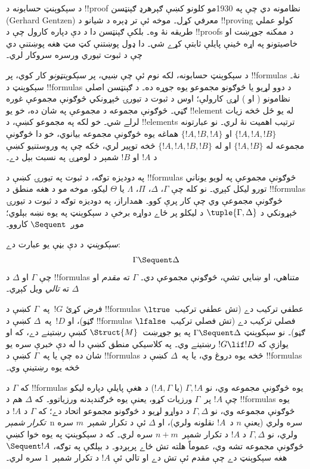 \documentclass[../../../include/open-logic-section]{subfiles}
\begin{document}


د سېکوېنټ حسابونه د !!{proof} نظامونه دي چې په 1930مو کلونو
کښې ګېرهرډ ګېنټسن (Gerhard Gentzen) معرفي کړل۔ موخه ئې تر
ډېره د شيانو د !!{proving} کولو عملي طريقه نۀ وه۔ بلکې ګېنټسن
دا د دې دپاره کارول چې د !!{proof}s د ممکنه جوړښت او خاصيتونو
په اړه ځينې پايلې ثابتې کړے شي۔ دا ډول پوښتنې کټ مټ هغه
پوښتنې دي چې د ثبوت تيوري ورسره سروکار لري۔

د سېکوېنټ حسابونه، لکه نوم ئې چې ښيي، پر \emph{سېکوېنټونو}
کار کوي، پر !!{formula}s نۀ۔ سېکوېنټ د !!{formula}s د دوو
لړيو يا څوګونو مجموعو يوه جوړه ده۔ د ګېنټسن اصلي نظامونو
( او ) لړۍ کارولې؛ اوس د ثبوت د تيورۍ
څېړونکي څوګونې مجموعې غوره ګڼي۔ څوګونې مجموعه د مجموعې
په شان ده، خو يو !!{element} له يو ځل څخه زيات لرلے شي۔
خو لکه په مجموعو کښې، د !!{element}s ترتيب اهميت نۀ لري۔
نو عبارتونه $\{!A, !A, !B\}$ او $\{!A, !B, !A\}$ هماغه يوه
څوګونې مجموعه بيانوي، خو دا څوګونې مجموعه له $\{!A,
!B\}$ او له $\{!A, !A, !B, !B\}$ څخه توپير لري، ځکه چې
په وروستنيو کښې د $!A$ او $!B$ شمېر د لومړۍ په نسبت بېل دے۔

په دوديزه توګه، د ثبوت په تيورۍ کښې د !!{formula}s څوګونې
مجموعې په لويو يوناني تورو ليکل کېږي۔ نو کله چې $\Gamma$، $\Delta$،
$\Pi$، $\Lambda$ يا $\Theta$ ليکو، موخه مو د هغه منطق د
!!{formula}s څوګونې مجموعې وي چې کار پرې کوو۔ همداراز، په
دوديزه توګه د ثبوت د تيورۍ څېړونکي د $\tuple{\Gamma, \Delta}$
د ليکلو پر ځاے دواړه برخې د سېکوېنټ په يوه نښه بېلوي؛
موږ~$\Sequent$ کاروو۔

\begin{defn}[سېکوېنټ]
\emph{سېکوېنټ} د دې بڼې يو عبارت دے:
\[
\Gamma \Sequent \Delta
\]
چې $\Gamma$ او $\Delta$ د !!{formula}s متناهي، او ښايي
تشې، څوګونې مجموعې دي۔ $\Gamma$ ته \emph{مقدم} او
$\Delta$ ته \emph{تالي} ويل کېږي۔
\end{defn}

فرض کړئ $!G$~په~$\Gamma$ کښې د !!{formula}s عطفي ترکيب دے
(تش عطفي ترکيب~$\ltrue$ ګڼو)، او $!D$~په~$\Delta$ کښې د
!!{formula}s فصلي ترکيب دے (تش فصلي ترکيب~$\lfalse$ ګڼو)۔
نو سېکوېنټ $\Gamma \Sequent \Delta$ په يو جوړښت~$\Struct{M}$
کښې رښتينے دے، که او يوازې که $!G \lif !D$ رښتينے وي۔
په کلاسيکي منطق کښې دا له دې خبرې سره يو شان ده چې يا
په~$\Gamma$ کښې د !!{formula}s څخه يوه دروغ وي، يا
په~$\Delta$ کښې د !!{formula}s څخه يوه رښتينې وي۔

که $\Gamma$ د !!{formula}s يوه څوګونې مجموعه وي، نو
$\Gamma, !A$ (يا $!A, \Gamma$) د هغې پايلې دپاره ليکو
چې $!A$ پر~$\Gamma$ ورزيات کړو، يعنې يوه څرګندېدنه ورزياتوو۔
که $\Delta$ هم د !!{formula}s يوه څوګونې مجموعه
وي، نو $\Gamma, \Delta$ د دواړو لړيو د څوګونو مجموعو اتحاد
دے؛ که $\Gamma$ د $!A$ د \emph{تکرار شمېر}~n سره ولري
(يعنې $n$ د~$!A$ نقلونه ولري)، او $\Delta$ ئې د تکرار
شمېر~$m$ سره ولري، نو $\Gamma, \Delta$ د $!A$ د تکرار
شمېر~$n+m$ سره لري۔ که د سېکوېنټ په يوه خوا کښې څوګونې
مجموعه تشه وي، عموماً هلته تش ځاے پرېږدو۔ د بېلګې په توګه،
$\Sequent !A$ هغه سېکوېنټ دے چې مقدم ئې تش دے او تالي
ئې $!A$ د تکرار شمېر~$1$ سره لري۔
\end{document}
